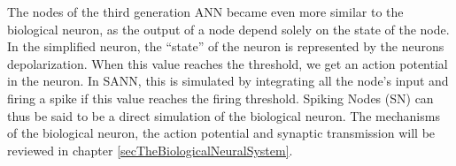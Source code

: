The nodes of the third generation ANN became even more similar to the biological neuron, as the output of a node depend solely on the state of the node.
In the simplified neuron, the ``state'' of the neuron is represented by the neurons depolarization.
When this value reaches the threshold, we get an action potential in the neuron.
In SANN, this is simulated by integrating all the node's input and firing a spike if this value reaches the firing threshold\cite{Kunkle02pulsedneural}.
Spiking Nodes (SN) can thus be said to be a direct simulation of the biological neuron.
The mechanisms of the biological neuron, the action potential and synaptic transmission will be reviewed in chapter \ref{secTheBiologicalNeuralSystem}.


































